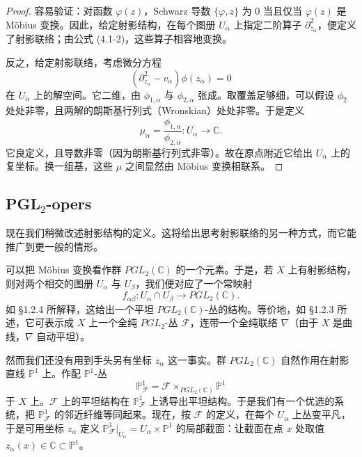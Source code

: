 \begin{proof}
容易验证：对函数 $\varphi(z)$，Schwarz 导数 $\{\varphi,z\}$ 为 $0$ 当且仅当 $\varphi(z)$ 是 Möbius 变换。因此，给定射影结构，在每个图册 $U_\alpha$ 上指定二阶算子 $\partial_{z_\alpha}^2$，便定义了射影联络；由公式 (4.1-2)，这些算子相容地变换。

反之，给定射影联络，考虑微分方程
\[
    \left(\partial_{z_\alpha}^2-v_\alpha\right)\phi(z_\alpha)=0
\]
在 $U_\alpha$ 上的解空间。它二维，由 $\phi_{1,\alpha}$ 与 $\phi_{2,\alpha}$ 张成。取覆盖足够细，可以假设 $\phi_2$ 处处非零，且两解的朗斯基行列式（Wronskian）处处非零。于是定义
\[
    \mu_\alpha=\frac{\phi_{1,\alpha}}{\phi_{2,\alpha}}:U_\alpha\to\mathbb{C}.
\]
它良定义，且导数非零（因为朗斯基行列式非零）。故在原点附近它给出 $U_\alpha$ 上的复坐标。换一组基，这些 $\mu$ 之间显然由 Möbius 变换相联系。
\end{proof}


\subsection{PGL$_2$-opers}

现在我们稍微改述射影结构的定义。这将给出思考射影联络的另一种方式，而它能推广到更一般的情形。

可以把 Möbius 变换看作群 $PGL_2(\mathbb{C})$ 的一个元素。于是，若 $X$ 上有射影结构，则对两个相交的图册 $U_\alpha$ 与 $U_\beta$，我们便对应了一个常映射
\[
    f_{\alpha\beta}:U_\alpha\cap U_\beta\longrightarrow PGL_2(\mathbb{C}).
\]
如 §1.2.4 所解释，这给出一个平坦 $PGL_2(\mathbb{C})$-丛的结构。等价地，如 §1.2.3 所述，它可表示成 $X$ 上一个全纯 $PGL_2$-丛 $\mathcal{F}$，连带一个全纯联络 $\nabla$（由于 $X$ 是曲线，$\nabla$ 自动平坦）。

然而我们还没有用到手头另有坐标 $z_\alpha$ 这一事实。群 $PGL_2(\mathbb{C})$ 自然作用在射影直线 $\mathbb{P}^1$ 上。作配 $\mathbb{P}^1$-丛
\[
    \mathbb{P}^1_{\mathcal{F}}=\mathcal{F}\times_{PGL_2(\mathbb{C})}\mathbb{P}^1
\]
于 $X$ 上。$\mathcal{F}$ 上的平坦结构在 $\mathbb{P}^1_{\mathcal{F}}$ 上诱导出平坦结构。于是我们有一个优选的系统，把 $\mathbb{P}^1_{\mathcal{F}}$ 的邻近纤维等同起来。现在，按 $\mathcal{F}$ 的定义，在每个 $U_\alpha$ 上丛变平凡，于是可用坐标 $z_\alpha$ 定义 $\mathbb{P}^1_{\mathcal{F}}|_{U_\alpha}=U_\alpha\times\mathbb{P}^1$ 的局部截面：让截面在点 $x$ 处取值 $z_\alpha(x)\in\mathbb{C}\subset\mathbb{P}^1$。


